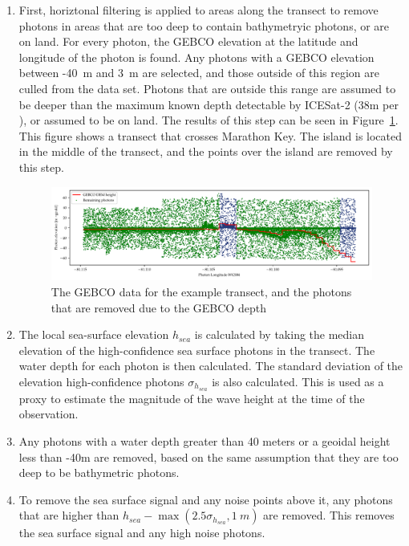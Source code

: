 \begin{enumerate}
    \item First, horiztonal filtering is applied to areas along the transect to remove photons in areas that are too deep to contain bathymetryic photons, or are on land. For every photon, the GEBCO elevation at the latitude and longitude of the photon is found. Any photons with a GEBCO elevation between -40~m and 3~m are selected, and those outside of this region are culled from the data set. Photons that are outside this range are assumed to be deeper than the maximum known depth detectable by ICESat-2 (38m per \citeauthor{Parrish2019}), or assumed to be on land. The results of this step can be seen in Figure~\ref{fig:gebco_filtering}. This figure shows a transect that crosses Marathon Key. The island is located in the middle of the transect, and the points over the island are removed by this step.
    
    \begin{figure}[htbp]
        \centering
        \includegraphics[width=\textwidth]{figures/methodology_gebco_filtering.pdf}
        \caption{The GEBCO data for the example transect, and the photons that are removed due to the GEBCO depth}
        \label{fig:gebco_filtering}
    \end{figure}

    \item The local sea-surface elevation $h_{sea}$ is calculated by taking the median elevation of the  high-confidence sea surface photons in the transect. The water depth for each photon is then calculated. The standard deviation of the elevation high-confidence photons $\sigma_{h_{sea}}$ is also calculated. This is used as a proxy to estimate the magnitude of the wave height at the time of the observation.
    \item Any photons with a water depth greater than 40 meters or a geoidal height less than -40m are removed, based on the same assumption that they are too deep to be bathymetric photons. 
    \item To remove the sea surface signal and any noise points above it, any photons that are higher than $h_{sea} - \max{(2.5\sigma_{h_{sea}},1~m)}$ are removed. This removes the sea surface signal and any high noise photons.
    

\end{enumerate}
